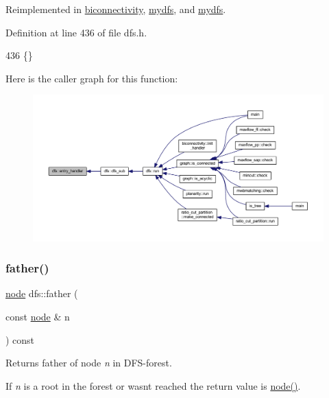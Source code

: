 Reimplemented in \mbox{\hyperlink{classbiconnectivity_acb402f2d144f84429b3cd009121245b0}{biconnectivity}}, \mbox{\hyperlink{classmydfs_af8bf3716d6d01426821692c1bca8970c}{mydfs}}, and \mbox{\hyperlink{classmydfs_af8bf3716d6d01426821692c1bca8970c}{mydfs}}.



Definition at line 436 of file dfs.\+h.


\begin{DoxyCode}
436 \{\}
\end{DoxyCode}
Here is the caller graph for this function\+:
\nopagebreak
\begin{figure}[H]
\begin{center}
\leavevmode
\includegraphics[width=350pt]{classdfs_a6473b0a5d792d9e45c3d32dfdc5b5ffc_icgraph}
\end{center}
\end{figure}
\mbox{\label{classdfs_a3012717ce541b3e56943e2c2c50efdf6}} 
\subsubsection{\texorpdfstring{father()}{father()}}
{\footnotesize\ttfamily \mbox{\hyperlink{classnode}{node}} dfs\+::father (\begin{DoxyParamCaption}\item[{const \mbox{\hyperlink{classnode}{node}} \&}]{n }\end{DoxyParamCaption}) const\hspace{0.3cm}{\ttfamily [inline]}}



Returns father of node {\itshape n} in D\+F\+S-\/forest. 

If {\itshape n} is a root in the forest or wasn\textquotesingle{}t reached the return value is {\ttfamily \mbox{\hyperlink{classnode}{node()}}}.


